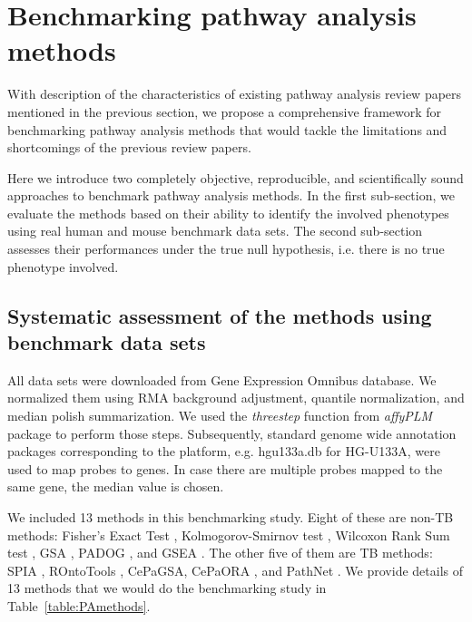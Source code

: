 \section{Benchmarking pathway analysis methods}

With description of the characteristics of existing pathway analysis review papers mentioned in the previous section, we propose a comprehensive framework for benchmarking pathway analysis methods that would tackle the limitations and shortcomings of the previous review papers.

Here we introduce two completely objective, reproducible, and scientifically sound approaches to benchmark pathway analysis methods. In the first sub-section, we evaluate the methods based on their ability to identify the involved phenotypes using real human and mouse benchmark data sets. The second sub-section assesses their performances under the true null hypothesis, i.e. there is no true phenotype involved.

\subsection{Systematic assessment of the methods using benchmark data sets}


All   data sets were downloaded from Gene Expression Omnibus database. We normalized them using RMA background adjustment, quantile normalization, and median polish summarization.  We used the \textit{threestep} function from \textit{affyPLM} package to perform those steps. Subsequently, standard genome wide annotation packages corresponding to the platform, e.g. hgu133a.db for HG-U133A, were used to map probes to genes. In case there are multiple probes mapped to the same gene, the median value is chosen.

We included 13 methods in this benchmarking study. Eight of these are non-TB methods: Fisher's Exact Test \cite{Fisher:1951}, Kolmogorov-Smirnov test \cite{massey1951kolmogorov}, Wilcoxon Rank Sum test \cite{wilcoxon1945individual}, GSA \cite{Efron:2007}, PADOG \cite{Tarca2012down}, and GSEA \cite{Subramanian:2005}. The other five of them are TB methods: SPIA \cite{SPIAversion2.14.0}, ROntoTools \cite{RontoToolsVersion1.2.0}, CePaGSA, CePaORA \cite{gu2012centrality, gu2013cepa}, and PathNet \cite{Dutta:2012}. We provide details of 13 methods that we would do the benchmarking study in Table~\ref{table:PAmethods}. 

